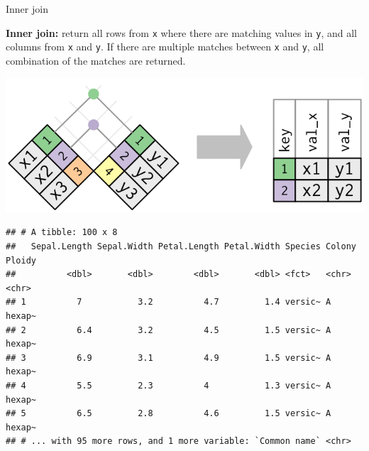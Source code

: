 \documentclass[14pt,ignorenonframetext,]{bredelebeamer}
\newenvironment{Shaded}{\begin{snugshade}}{\end{snugshade}}
\newcommand{\KeywordTok}[1]{\textcolor[rgb]{0.94,0.87,0.69}{#1}}
\newcommand{\DataTypeTok}[1]{\textcolor[rgb]{0.87,0.87,0.75}{#1}}
\newcommand{\DecValTok}[1]{\textcolor[rgb]{0.86,0.86,0.80}{#1}}
\newcommand{\StringTok}[1]{\textcolor[rgb]{0.80,0.58,0.58}{#1}}
\newcommand{\OperatorTok}[1]{\textcolor[rgb]{0.94,0.94,0.82}{#1}}
\newcommand{\NormalTok}[1]{\textcolor[rgb]{0.80,0.80,0.80}{#1}}
\begin{document}
\begin{frame}[fragile]{Inner join}

\textbf{Inner join:} return all rows from \texttt{x} where there are
matching values in \texttt{y}, and all columns from \texttt{x} and
\texttt{y}. If there are multiple matches between \texttt{x} and
\texttt{y}, all combination of the matches are returned.

\begin{center}\includegraphics[width=0.4\linewidth]{images/join-inner} \end{center}

\small

\begin{Shaded}
\end{Shaded}

\begin{verbatim}
## # A tibble: 100 x 8
##   Sepal.Length Sepal.Width Petal.Length Petal.Width Species Colony Ploidy
##          <dbl>       <dbl>        <dbl>       <dbl> <fct>   <chr>  <chr> 
## 1          7           3.2          4.7         1.4 versic~ A      hexap~
## 2          6.4         3.2          4.5         1.5 versic~ A      hexap~
## 3          6.9         3.1          4.9         1.5 versic~ A      hexap~
## 4          5.5         2.3          4           1.3 versic~ A      hexap~
## 5          6.5         2.8          4.6         1.5 versic~ A      hexap~
## # ... with 95 more rows, and 1 more variable: `Common name` <chr>
\end{verbatim}

\end{frame}
\end{document}
